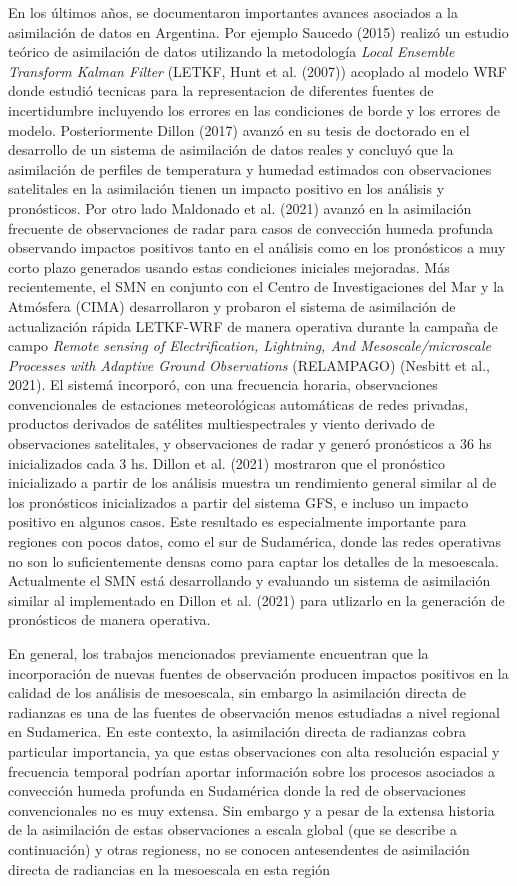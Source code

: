 \documentclass[12pt,oneside,a4paper]{reedthesis}
\begin{document}
En los últimos años, se documentaron importantes avances asociados a la asimilación de datos en Argentina. Por ejemplo Saucedo (2015) realizó un estudio teórico de asimilación de datos utilizando la metodología \emph{Local Ensemble Transform Kalman Filter} (LETKF, Hunt et al. (2007)) acoplado al modelo WRF donde estudió tecnicas para la representacion de diferentes fuentes de incertidumbre incluyendo los errores en las condiciones de borde y los errores de modelo. Posteriormente Dillon (2017) avanzó en su tesis de doctorado en el desarrollo de un sistema de asimilación de datos reales y concluyó que la asimilación de perfiles de temperatura y humedad estimados con observaciones satelitales en la asimilación tienen un impacto positivo en los análisis y pronósticos. Por otro lado Maldonado et al. (2021) avanzó en la asimilación frecuente de observaciones de radar para casos de convección humeda profunda observando impactos positivos tanto en el análisis como en los pronósticos a muy corto plazo generados usando estas condiciones iniciales mejoradas. Más recientemente, el SMN en conjunto con el Centro de Investigaciones del Mar y la Atmósfera (CIMA) desarrollaron y probaron el sistema de asimilación de actualización rápida LETKF-WRF de manera operativa durante la campaña de campo \emph{Remote sensing of Electrification, Lightning, And Mesoscale/microscale Processes with Adaptive Ground Observations} (RELAMPAGO) (Nesbitt et al., 2021). El sistemá incorporó, con una frecuencia horaria, observaciones convencionales de estaciones meteorológicas automáticas de redes privadas, productos derivados de satélites multiespectrales y viento derivado de observaciones satelitales, y observaciones de radar y generó pronósticos a 36 hs inicializados cada 3 hs. Dillon et al. (2021) mostraron que el pronóstico inicializado a partir de los análisis muestra un rendimiento general similar al de los pronósticos inicializados a partir del sistema GFS, e incluso un impacto positivo en algunos casos. Este resultado es especialmente importante para regiones con pocos datos, como el sur de Sudamérica, donde las redes operativas no son lo suficientemente densas como para captar los detalles de la mesoescala. Actualmente el SMN está desarrollando y evaluando un sistema de asimilación similar al implementado en Dillon et al. (2021) para utlizarlo en la generación de pronósticos de manera operativa.

En general, los trabajos mencionados previamente encuentran que la incorporación de nuevas fuentes de observación producen impactos positivos en la calidad de los análisis de mesoescala, sin embargo la asimilación directa de radianzas es una de las fuentes de observación menos estudiadas a nivel regional en Sudamerica. En este contexto, la asimilación directa de radianzas cobra particular importancia, ya que estas observaciones con alta resolución espacial y frecuencia temporal podrían aportar información sobre los procesos asociados a convección humeda profunda en Sudamérica donde la red de observaciones convencionales no es muy extensa. Sin embargo y a pesar de la extensa historia de la asimilación de estas observaciones a escala global (que se describe a continuación) y otras regioness, no se conocen antesendentes de asimilación directa de radiancias en la mesoescala en esta región
\end{document}
